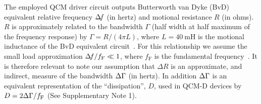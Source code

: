 The employed QCM driver circuit outputs Butterworth van Dyke (BvD)
equivalent relative frequency $\Delta\!f$ (in hertz) and motional resistance $R$ (in ohms).
$R$ is approximately related to the bandwidth $\Gamma$ (half width at half
maximum of the frequency response) by $\Gamma=R/\left(4\pi L\right)$, where
$L=\SI{40}{\milli\henry}$ is the motional inductance of the BvD
equivalent circuit~\cite{arnau2002circuit}.  For this
relationship we assume the small load approximation $\Delta\!f/f_\mathrm{F} \ll
1$, where $f_\mathrm{F}$ is the fundamental frequency~\cite{geelhood2002transient}.
It is therefore relevant to note our assumption that $\Delta R$ is an
approximate, and indirect, measure of the bandwidth $\Delta\Gamma$ (in
hertz).  In addition $\Delta\Gamma$ is an equivalent representation of the ``dissipation'', $D$, used in
QCM-D devices by $D=2\Delta\Gamma/f_\mathrm{F}$ (See Supplementary Note 1).
